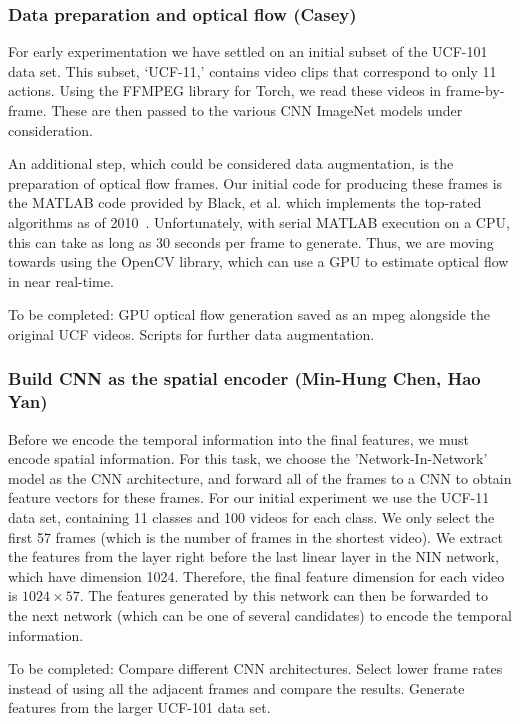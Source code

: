 \subsubsection*{Data preparation and optical flow (Casey)}
For early experimentation we have settled on an initial subset of the UCF-101 data set. This subset, `UCF-11,' contains video clips that correspond to only 11 actions. Using the FFMPEG library for Torch, we read these videos in frame-by-frame. These are then passed to the various CNN ImageNet models under consideration.

An additional step, which could be considered data augmentation, is the preparation of optical flow frames. Our initial code for producing these frames is the MATLAB code provided by Black, et al. which implements the top-rated algorithms as of 2010~\cite{5539939}. Unfortunately, with serial MATLAB execution on a CPU, this can take as long as 30 seconds per frame to generate. Thus, we are moving towards using the OpenCV library, which can use a GPU to estimate optical flow in near real-time. 

To be completed: GPU optical flow generation saved as an mpeg alongside the original UCF videos. Scripts for further data augmentation. 

\subsubsection*{Build CNN as the spatial encoder (Min-Hung Chen, Hao Yan)}
Before we encode the temporal information into the final features, we must encode spatial information. For this task, we choose the 'Network-In-Network'~\cite{nin} model as the CNN architecture, and forward all of the frames to a CNN to obtain feature vectors for these frames. For our initial experiment we use the UCF-11 data set, containing 11 classes and 100 videos for each class. We only select the first 57 frames (which is the number of frames in the shortest video). We extract the features from the layer right before the last linear layer in the NIN network, which have dimension 1024. Therefore, the final feature dimension for each video is $1024 \times 57$. The features generated by this network can then be forwarded to the next network (which can be one of several candidates) to encode the temporal information.

To be completed: Compare different CNN architectures. Select lower frame rates instead of using all the adjacent frames and compare the results. Generate features from the larger UCF-101 data set.

